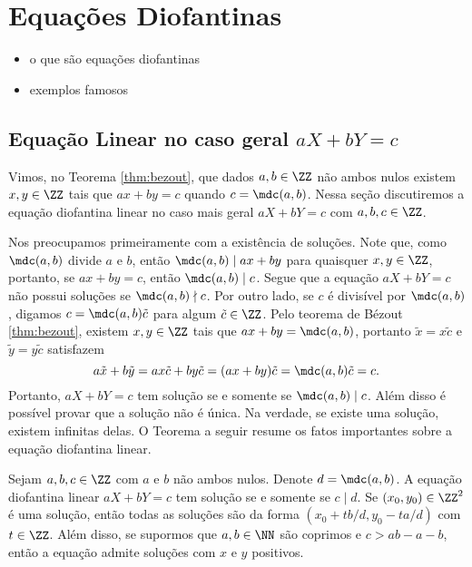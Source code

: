 \chapter{Equações Diofantinas}
\label{chap:eqdiof}

\begin{itemize}
  \item o que são equações diofantinas
  \item exemplos famosos 
\end{itemize}

\section{Equação Linear no caso geral $aX+bY = c$}
\label{sec:dioflinear}
Vimos, no Teorema \ref{thm:bezout}, que dados
$a,b \in \ZZ$ não ambos nulos existem
$x,y \in \ZZ$ tais que $ax+by = c$ quando
$c = \mdc(a,b)$. Nessa seção
discutiremos a equação diofantina linear
no caso mais geral $aX + bY = c$ com $a,b,c \in \ZZ$. 

Nos preocupamos primeiramente com a existência
de soluções. Note que, como $\mdc(a,b)$ divide
$a$ e $b$, então $\mdc(a,b)\mid ax+by$ para
quaisquer $x,y \in \ZZ$, portanto, se $ax+by = c$,
então $\mdc(a,b)\mid c$. Segue que a equação
$aX + bY = c$ não possui soluções se
$\mdc(a,b)\nmid c$. Por outro lado, se $c$ 
é divisível por $\mdc(a,b)$, digamos
$c = \mdc(a,b)\tilde{c}$ para algum $\tilde{c} \in \ZZ$. 
Pelo teorema de Bézout \ref{thm:bezout}, existem
$x,y \in \ZZ$ tais que $ax+by = \mdc(a,b)$,
portanto $\tilde{x} = x\tilde{c}$ e
$\tilde{y} = y\tilde{c}$ satisfazem
$$
a\tilde{x} + b\tilde{y} = ax\tilde{c} + by\tilde{c}
 = (ax+by)\tilde{c} = \mdc(a,b)\tilde{c} = c.
$$
Portanto, $aX + bY = c$ tem solução se e somente se
$\mdc(a,b) \mid c$. Além disso é possível provar
que a solução não é única. Na verdade, se existe uma
solução, existem infinitas delas. O Teorema a seguir
resume os fatos importantes sobre a equação
diofantina linear.
\begin{theorem}
\label{thm:eqdlineargeral}
  Sejam $a,b,c \in \ZZ$ com $a$ e $b$ não ambos nulos. Denote
  $d = \mdc(a,b)$. A equação diofantina linear $aX + bY = c$ tem
  solução se e somente se $c\mid d$. Se $(x_0,y_0) \in \ZZ^2$ é
  uma solução, então todas as soluções são da forma
  $(x_0 + tb/d,y_0 - ta/d)$ com $t \in \ZZ$. Além disso, se
  supormos que $a,b \in \NN$ são coprimos e $c>ab-a-b$, então
  a equação admite soluções com $x$ e $y$ positivos.
\end{theorem}


